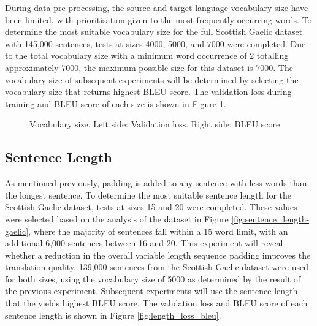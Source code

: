 During data pre-processing, the source and target language vocabulary size have been limited, with prioritisation given to the most frequently occurring words. To determine the most suitable vocabulary size for the full Scottish Gaelic dataset with 145,000 sentences, tests at sizes 4000, 5000, and 7000 were completed. Due to the total vocabulary size with a minimum word occurrence of 2 totalling approximately 7000, the maximum possible size for this dataset is 7000. 
The vocabulary size of subsequent experiments will be determined by selecting the vocabulary size that returns highest \acrshort{BLEU} score. The validation loss during training and \acrshort{BLEU} score of each size is shown in Figure \ref{fig:vocab_loss_bleu}.

\begin{figure}[ht!]
\centering
{}
\captionsetup{justification=centering}
\caption[Vocabulary size validation loss and BLEU score]{Vocabulary size. Left side: Validation loss. Right side: BLEU score}
\label{fig:vocab_loss_bleu}
\end{figure}


\subsection{Sentence Length}
\label{sec:4-sentence_length}

As mentioned previously, padding is added to any sentence with less words than the longest sentence. To determine the most suitable sentence length for the Scottish Gaelic dataset, tests at sizes 15 and 20 were completed. These values were selected based on the analysis of the dataset in Figure \ref{fig:sentence_length-gaelic}, where the majority of sentences fall within a 15 word limit, with an additional 6,000 sentences between 16 and 20. This experiment will reveal whether a reduction in the overall variable length sequence padding improves the translation quality.
139,000 sentences from the Scottish Gaelic dataset were used for both sizes, using the vocabulary size of 5000 as determined by the result of the previous experiment. Subsequent experiments will use the sentence length that the yields highest \acrshort{BLEU} score. The validation loss and \acrshort{BLEU} score of each sentence length is shown in Figure \ref{fig:length_loss_bleu}.

